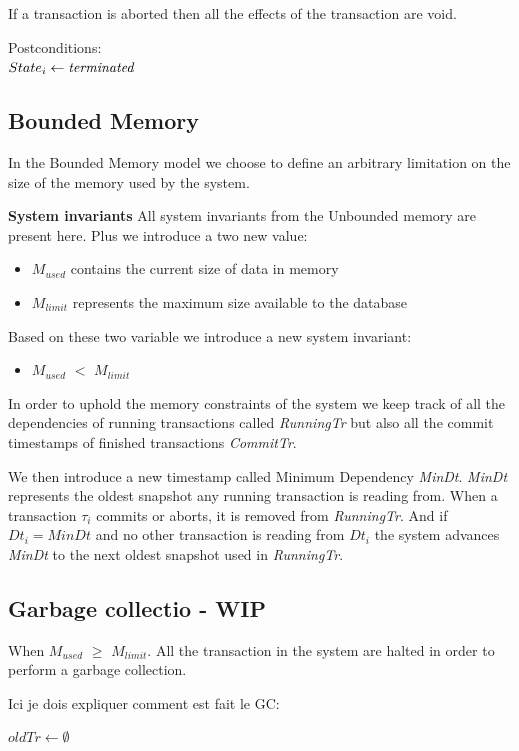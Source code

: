 \documentclass[systeme,french,english]{compas2022}
\begin{document}
If a transaction is aborted then all the effects of the transaction are void.

Postconditions:\\
$State_i \leftarrow \emph{terminated}$ \\

\subsection{Bounded Memory}

In the Bounded Memory model we choose to define an arbitrary limitation on the size of the memory used by the system.

\textbf{System invariants}
All system invariants from the Unbounded memory are present here.
Plus we introduce a two new value:
\begin{itemize}
  \item \emph{$M_{used}$} contains the current size of data in memory
  \item \emph{$M_{limit}$} represents the maximum size available to the database
\end{itemize}
Based on these two variable we introduce a new system invariant:
\begin{itemize}
  \item \emph{$M_{used}$} $<$ \emph{$M_{limit}$}
\end{itemize}
In order to uphold the memory constraints of the system we keep track of all the dependencies of running transactions called \emph{RunningTr} but also all the commit timestamps of finished transactions \emph{CommitTr}.

We then introduce a new timestamp called Minimum Dependency \emph{MinDt}.
\emph{MinDt} represents the oldest snapshot any running transaction is reading from.
When a transaction $\tau_i$ commits or aborts, it is removed from \emph{RunningTr}. 
And if $Dt_i = MinDt$ and no other transaction is reading from $Dt_i$ the system advances \emph{MinDt} to the next oldest snapshot used in \emph{RunningTr}.



\subsection{Garbage collectio - WIP}
When \emph{$M_{used}$} $\geq$ \emph{$M_{limit}$}. 
All the transaction in the system are halted in order to perform a garbage collection.

Ici je dois expliquer comment est fait le GC:\\
\begin{algorithm}
  \(oldTr \longleftarrow \emptyset\)\;
\end{algorithm}
\end{document}
